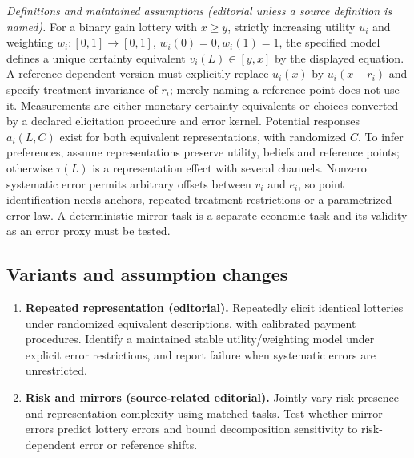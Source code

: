 \documentclass[11pt,a4paper]{article}
\begin{document}
\emph{Definitions and maintained assumptions (editorial unless a source definition is named).} For a binary gain lottery with \(x\ge y\), strictly increasing utility \(u_i\) and weighting \(w_i:[0,1]\to[0,1]\), \(w_i(0)=0,w_i(1)=1\), the specified model defines a unique certainty equivalent \(v_i(L)\in[y,x]\) by the displayed equation. A reference-dependent version must explicitly replace \(u_i(x)\) by \(u_i(x-r_i)\) and specify treatment-invariance of \(r_i\); merely naming a reference point does not use it. Measurements are either monetary certainty equivalents or choices converted by a declared elicitation procedure and error kernel. Potential responses \(a_i(L,C)\) exist for both equivalent representations, with randomized \(C\). To infer preferences, assume representations preserve utility, beliefs and reference points; otherwise \(\tau(L)\) is a representation effect with several channels. Nonzero systematic error permits arbitrary offsets between \(v_i\) and \(e_i\), so point identification needs anchors, repeated-treatment restrictions or a parametrized error law. A deterministic mirror task is a separate economic task and its validity as an error proxy must be tested.
\subsection*{Variants and assumption changes}
\begin{enumerate}
\item \textbf{Repeated representation (editorial).} Repeatedly elicit identical lotteries under randomized equivalent descriptions, with calibrated payment procedures. Identify a maintained stable utility/weighting model under explicit error restrictions, and report failure when systematic errors are unrestricted.
\item \textbf{Risk and mirrors (source-related editorial).} Jointly vary risk presence and representation complexity using matched tasks. Test whether mirror errors predict lottery errors and bound decomposition sensitivity to risk-dependent error or reference shifts.
\end{enumerate}
\end{document}
